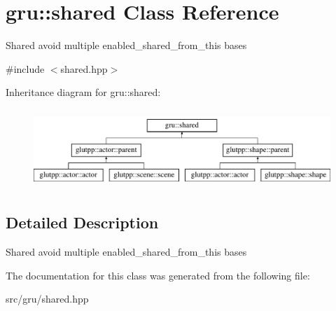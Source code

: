 \hypertarget{classgru_1_1shared}{\section{gru\-:\-:shared \-Class \-Reference}
\label{classgru_1_1shared}
}


\-Shared avoid multiple enabled\-\_\-shared\-\_\-from\-\_\-this bases  




{\ttfamily \#include $<$shared.\-hpp$>$}

\-Inheritance diagram for gru\-:\-:shared\-:\begin{figure}[H]
\begin{center}
\leavevmode
\includegraphics[height=3.000000cm]{classgru_1_1shared}
\end{center}
\end{figure}


\subsection{\-Detailed \-Description}
\-Shared avoid multiple enabled\-\_\-shared\-\_\-from\-\_\-this bases 

\-The documentation for this class was generated from the following file\-:\begin{DoxyCompactItemize}
\item 
src/gru/shared.\-hpp\end{DoxyCompactItemize}
